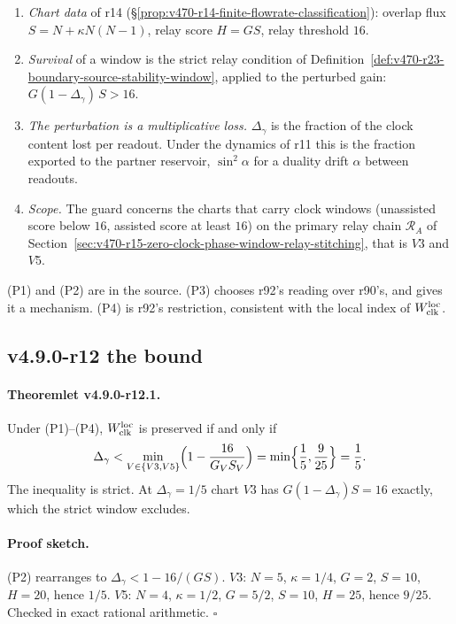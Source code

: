 \begin{enumerate}[leftmargin=2em]
\item[(P1)] \emph{Chart data} of r14 (\S\ref{prop:v470-r14-finite-flowrate-classification}): overlap flux
\(S=N+\kappa N(N-1)\), relay score \(H=GS\), relay threshold \(16\).
\item[(P2)] \emph{Survival} of a window is the strict relay condition of
Definition~\ref{def:v470-r23-boundary-source-stability-window}, applied to the perturbed gain:
\(G(1-\Delta_\gamma)\,S>16\).
\item[(P3)] \emph{The perturbation is a multiplicative loss.}  \(\Delta_\gamma\) is the fraction of the clock content lost per
readout.  Under the dynamics of r11 this is the fraction exported to the partner reservoir, \(\sin^2\alpha\) for a duality
drift \(\alpha\) between readouts.
\item[(P4)] \emph{Scope.}  The guard concerns the charts that carry clock windows (unassisted score below \(16\), assisted
score at least \(16\)) on the primary relay chain \(\mathcal R_A\) of
Section~\ref{sec:v470-r15-zero-clock-phase-window-relay-stitching}, that is \(V3\) and \(V5\).
\end{enumerate}
(P1) and (P2) are in the source.  (P3) chooses r92's reading over r90's, and gives it a mechanism.  (P4) is r92's
restriction, consistent with the local index of \(W_{\rm clk}^{\rm loc}\).

\subsection*{v4.9.0-r12 the bound}
\label{subsec:v490-r12-bound}

\paragraph{Theoremlet v4.9.0-r12.1.}
Under (P1)--(P4), \(W_{\rm clk}^{\rm loc}\) is preserved if and only if
\[
\Delta_\gamma<\min_{V\in\{V3,V5\}}\Bigl(1-\frac{16}{G_VS_V}\Bigr)=\min\Bigl\{\frac15,\frac9{25}\Bigr\}=\frac15 .
\]
The inequality is strict.  At \(\Delta_\gamma=1/5\) chart \(V3\) has \(G(1-\Delta_\gamma)S=16\) exactly, which the strict window
excludes.

\paragraph{Proof sketch.}
(P2) rearranges to \(\Delta_\gamma<1-16/(GS)\).  \(V3\): \(N=5\), \(\kappa=1/4\), \(G=2\), \(S=10\), \(H=20\), hence \(1/5\).
\(V5\): \(N=4\), \(\kappa=1/2\), \(G=5/2\), \(S=10\), \(H=25\), hence \(9/25\).  Checked in exact rational arithmetic.  \(\square\)

